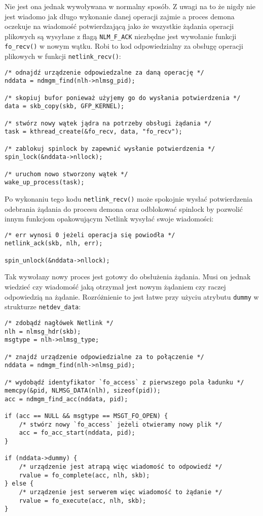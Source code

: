 \documentclass[10pt]{article}
\begin{document}
Nie jest ona jednak wywoływana w normalny sposób. Z uwagi na to że nigdy nie jest wiadomo jak długo wykonanie danej operacji zajmie a proces demona oczekuje na wiadomość potwierdzającą jako że wszystkie żądania operacji plikowych są wysyłane z flagą \texttt{NLM\_F\_ACK} niezbędne jest wywołanie funkcji \texttt{fo\_recv()} w nowym wątku. Robi to kod odpowiedzialny za obsługę operacji plikowych w funkcji \texttt{netlink\_recv()}:

\begin{verbatim}
/* odnajdź urządzenie odpowiedzalne za daną operację */
nddata = ndmgm_find(nlh->nlmsg_pid);

/* skopiuj bufor ponieważ użyjemy go do wysłania potwierdzenia */
data = skb_copy(skb, GFP_KERNEL);

/* stwórz nowy wątek jądra na potrzeby obsługi żądania */
task = kthread_create(&fo_recv, data, "fo_recv");

/* zablokuj spinlock by zapewnić wysłanie potwierdzenia */
spin_lock(&nddata->nllock);

/* uruchom nowo stworzony wątek */
wake_up_process(task);
\end{verbatim}

Po wykonaniu tego kodu \texttt{netlink\_recv()} może spokojnie wysłać potwierdzenia odebrania żądania do procesu demona oraz odblokować spinlock by pozwolić innym funkcjom opakowującym Netlink wysyłać swoje wiadomości:

\begin{verbatim}
/* err wynosi 0 jeżeli operacja się powiodła */
netlink_ack(skb, nlh, err);

spin_unlock(&nddata->nllock);
\end{verbatim}

Tak wywołany nowy proces jest gotowy do obsłużenia żądania. Musi on jednak wiedzieć czy wiadomość jaką otrzymał jest nowym żądaniem czy raczej odpowiedzią na żądanie. Rozróżnienie to jest łatwe przy użyciu atrybutu \texttt{dummy} w strukturze \texttt{netdev\_data}:

\begin{verbatim}
/* zdobądź nagłówek Netlink */
nlh = nlmsg_hdr(skb);
msgtype = nlh->nlmsg_type;

/* znajdź urządzenie odpowiedzialne za to połączenie */
nddata = ndmgm_find(nlh->nlmsg_pid);

/* wydobądź identyfikator `fo_access` z pierwszego pola ładunku */
memcpy(&pid, NLMSG_DATA(nlh), sizeof(pid));
acc = ndmgm_find_acc(nddata, pid);

if (acc == NULL && msgtype == MSGT_FO_OPEN) {
    /* stwórz nowy `fo_access` jeżeli otwieramy nowy plik */
    acc = fo_acc_start(nddata, pid);
}

if (nddata->dummy) {
    /* urządzenie jest atrapą więc wiadomość to odpowiedź */
    rvalue = fo_complete(acc, nlh, skb);
} else {
    /* urządzenie jest serwerem więc wiadomość to żądanie */
    rvalue = fo_execute(acc, nlh, skb);
}
\end{verbatim}
\end{document}
